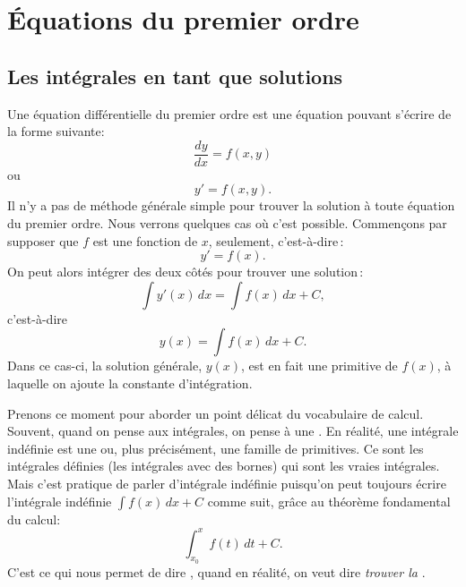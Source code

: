 \chapter{Équations du premier ordre} \label{fo:chapter}


\section{Les intégrales en tant que solutions}
\label{integralsols:section}


Une équation différentielle du premier ordre est une équation pouvant s'écrire de la forme suivante: 
%
\begin{equation*}
	\frac{dy}{dx} = f(x,y) 
\end{equation*}
ou 
\begin{equation*}
	y' = f(x,y) .
\end{equation*}
Il n'y a pas de méthode générale simple pour trouver la solution  à toute équation du premier ordre.  Nous verrons quelques cas où c'est possible.  Commençons par supposer que $f$ est une fonction de $x$, seulement, c'est-à-dire\,: 
\begin{equation} \label{ias:inteq}
	y' = f(x) .
\end{equation}
On peut alors intégrer des deux côtés pour trouver une solution\,: 
\begin{equation*}
	\int y'(x) \,dx = \int f(x) \,dx + C ,
\end{equation*}
c'est-à-dire
\begin{equation*}
	y(x) = \int f(x) \,dx + C .
\end{equation*}
Dans ce cas-ci, la solution générale, $y(x)$, est en fait une primitive de $f(x)$, à laquelle on ajoute la constante d'intégration.

\medskip

Prenons ce moment pour aborder un point délicat du vocabulaire de calcul.  Souvent, quand on pense aux intégrales, on pense à une .  En réalité, une intégrale indéfinie est une \emph{} ou, plus précisément, une famille de primitives.  Ce sont les intégrales définies (les intégrales avec des bornes) qui sont les vraies intégrales.  Mais c'est pratique de parler d'intégrale \og{}indéfinie\fg{} puisqu'on peut toujours écrire l'intégrale indéfinie 
$\int f(x) \,dx + C$ comme suit, grâce au théorème fondamental du calcul: 
\begin{equation*}
	\int_{x_0}^x f(t) \,dt + C .
\end{equation*}
C'est ce qui nous permet de dire  \emph{ }, quand en réalité, on veut dire  
\emph{trouver la }.

